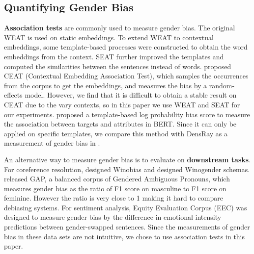 \subsection{Quantifying Gender Bias}
\textbf{Association tests} are commonly used to measure
gender bias. The original WEAT is used on static
embeddings. To extend WEAT to contextual embeddings, some
template-based processes
\cite{karve2019conceptor,kurita2019measuring,Tan2019AssessingSA}
were constructed to obtain the word embeddings from the
context. SEAT further improved the templates and computed
the similarities between the sentences instead of
words.  proposed CEAT (Contextual
Embedding Association Test), which samples the occurrences
from the corpus to get the embeddings, and measures the bias
by a random-effects model. However, we find that it is
difficult to obtain a stable result on CEAT due to the
 vary
contexts, so in this paper we  use WEAT and SEAT for our
experiments.  proposed a
template-based log probability bias score to measure the
association between targets and attributes in BERT. Since it
can only be applied on specific templates, we compare this
method with DensRay as a measurement of gender bias in
.

An alternative way to measure gender bias is to evaluate on
\textbf{downstream tasks}. For coreference resolution,
 designed Winobias and
 designed Winogender
schemas.  released GAP, a balanced
corpus of Gendered Ambiguous Pronouns, which measures gender
bias as the ratio of F1 score on masculine to F1 score on
feminine. However the ratio is very close to 1
\cite{Chada_2019,Attree_2019} making it hard to compare
debiasing systems. For sentiment analysis, Equity Evaluation
Corpus (EEC) \cite{Kiritchenko_2018} was designed to measure
gender bias by the difference in emotional intensity
predictions between gender-swapped sentences. Since the
measurements of gender bias in these data sets are not
intuitive, we chose to use association tests in
this paper.

